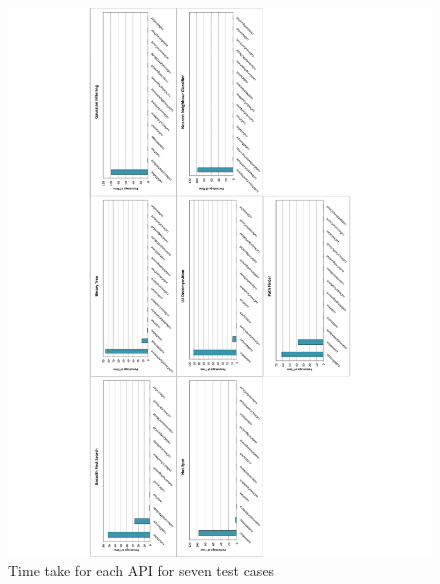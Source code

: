 \documentclass[paper=a4, fontsize=11pt]{scrartcl}
\numberwithin{equation}{section}		%
\numberwithin{figure}{section}			%
\numberwithin{table}{section}				%
\begin{document}
\begin{figure}[!h]
\centering
\includegraphics[scale=0.6]{../imgs/m6000.pdf}
\caption{Time take for each API for seven test cases}
\label{fig:6000}
\end{figure}
\end{document}
